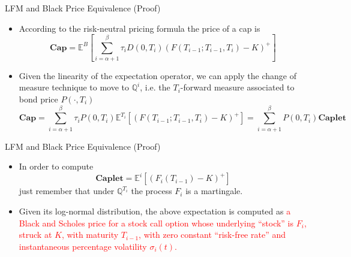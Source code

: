 \documentclass{beamer}
\begin{document}
\begin{frame}{LFM and Black Price Equivalence (Proof)}
	\begin{itemize}
	\item<1-> According to the risk-neutral pricing formula the price of a cap is 
	\begin{equation*}
		\textbf{Cap}=\mathbb{E}^B\left[\sum_{i=\alpha+1}^\beta 	\tau_iD(0, T_i)(F(T_{i-1}; T_{i-1}, T_i) - K)^+\right]
	\end{equation*}
	\item<2-> Given the linearity of the expectation operator, we can apply the change of measure technique to move to $\mathbb{Q}^i$, i.e. the $T_i$-forward measure associated to bond price $P(\cdot,T_i)$
	\begin{equation*}
		\textbf{Cap}= \sum_{i=\alpha+1}^\beta \tau_i P(0, T_i)\mathbb{E}^{T_i}[(F(T_{i-1}; T_{i-1}, T_i) - K)^+] = \sum_{i=\alpha+1}^\beta P(0, T_i)\textbf{Caplet}
	\end{equation*}
	\end{itemize}
\end{frame}

\begin{frame}{LFM and Black Price Equivalence (Proof)}
	\begin{itemize}
	\item In order to compute 
	\begin{equation*}
		\textbf{Caplet} = \mathbb{E}^i[(F_i(T_{i-1}) - K)^+]
	\end{equation*}
	just remember that under $\mathbb{Q}^{T_i}$ the process $F_i$ is a martingale.
	\item Given its log-normal distribution, the above expectation is computed as \textcolor{red}{a Black and Scholes price for a stock call option whose underlying “stock” is $F_i$, struck at $K$, with maturity $T_{i-1}$, with zero constant “risk-free rate” and instantaneous percentage volatility $\sigma_i(t)$.}
\end{itemize}
\end{frame}
\end{document}
